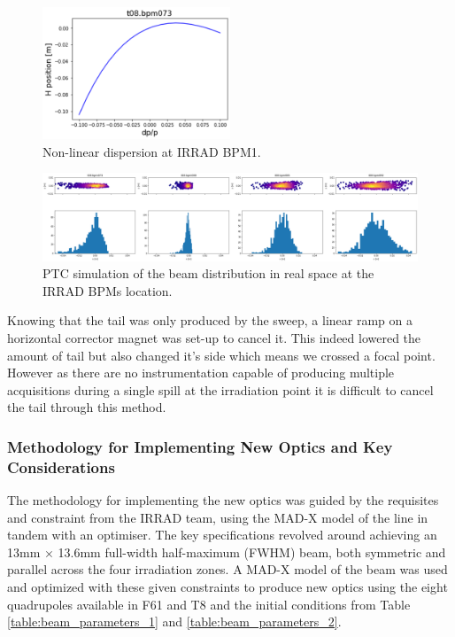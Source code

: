 \begin{figure}[htbp]
\centering
\includegraphics[width=0.5\textwidth]{03_Empirical_Measurements/images/nonlinear_dispersion.png}
\caption{Non-linear dispersion at IRRAD BPM1.}
\label{fig:nonlinear_dispersion}
\end{figure}

\begin{figure}[htbp]
\centering
\includegraphics[width=1.0\textwidth]{03_Empirical_Measurements/images/dispersion_3percent_dpp.png}
\caption{PTC simulation of the beam distribution in real space at the IRRAD BPMs location.}
\label{fig:PTC_dispersion}
\end{figure}

Knowing that the tail was only produced by the sweep, a linear ramp on a horizontal corrector magnet was set-up to cancel it. This indeed lowered the amount of tail but also changed it's side which means we crossed a focal point. However as there are no instrumentation capable of producing multiple acquisitions during a single spill at the irradiation point it is difficult to cancel the tail through this method.

\subsubsection{Methodology for Implementing New Optics and Key Considerations}

The methodology for implementing the new optics was guided by the requisites and constraint from the IRRAD team, using the MAD-X model of the line in tandem with an optimiser. The key specifications revolved around achieving an 13mm $\times$ 13.6mm full-width half-maximum (FWHM) beam, both symmetric and parallel across the four irradiation zones. A MAD-X model of the beam was used and optimized with these given constraints to produce new optics using the eight quadrupoles available in F61 and T8 and the initial conditions from Table \ref{table:beam_parameters_1} and \ref{table:beam_parameters_2}.
\\

